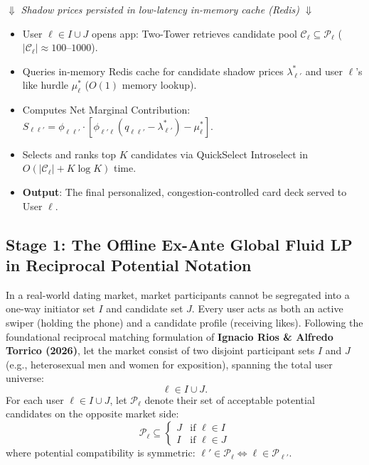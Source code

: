 \documentclass[11pt,letterpaper]{article}
\theoremstyle{definition}
\theoremstyle{plain}
\theoremstyle{remark}
\begin{document}
\begin{center}
    $\boldsymbol{\Downarrow}$ \quad \emph{Shadow prices persisted in low-latency in-memory cache (Redis)} \quad $\boldsymbol{\Downarrow}$
\end{center}

\begin{tcolorbox}[colback=green!3!white,colframe=green!50!black,arc=2mm,title=\textbf{STAGE 2: Online Micro Re-Ranking (Executed on Mobile App Open in $<2$ ms)}]
\small
\begin{itemize}[leftmargin=1.5em]
    \item User $\ell \in I \cup J$ opens app: Two-Tower retrieves candidate pool $\mathcal{C}_\ell \subseteq \mathcal{P}_\ell$ ($|\mathcal{C}_\ell| \approx 100\text{--}1000$).
    \item Queries in-memory Redis cache for candidate shadow prices $\lambda_{\ell'}^*$ and user $\ell$'s like hurdle $\mu_\ell^*$ ($O(1)$ memory lookup).
    \item Computes Net Marginal Contribution: $S_{\ell\ell'} = \phi_{\ell\ell'} \cdot \left[ \phi_{\ell'\ell}(q_{\ell\ell'} - \lambda_{\ell'}^*) - \mu_\ell^* \right]$.
    \item Selects and ranks top $K$ candidates via QuickSelect Introselect in $O(|\mathcal{C}_\ell| + K \log K)$ time.
    \item \textbf{Output}: The final personalized, congestion-controlled card deck served to User $\ell$.
\end{itemize}
\end{tcolorbox}

\subsection{Stage 1: The Offline Ex-Ante Global Fluid LP in Reciprocal Potential Notation}
In a real-world dating market, market participants cannot be segregated into a one-way initiator set $I$ and candidate set $J$. Every user acts as both an active swiper (holding the phone) and a candidate profile (receiving likes).
Following the foundational reciprocal matching formulation of \textbf{Ignacio Rios \& Alfredo Torrico (2026)}, let the market consist of two disjoint participant sets $I$ and $J$ (e.g., heterosexual men and women for exposition), spanning the total user universe:
\[
    \ell \in I \cup J.
\]
For each user $\ell \in I \cup J$, let $\mathcal{P}_\ell$ denote their set of acceptable potential candidates on the opposite market side:
\[
    \mathcal{P}_\ell \subseteq \begin{cases} J & \text{if } \ell \in I \\ I & \text{if } \ell \in J \end{cases}
\]
where potential compatibility is symmetric: $\ell' \in \mathcal{P}_\ell \iff \ell \in \mathcal{P}_{\ell'}$.
\end{document}
